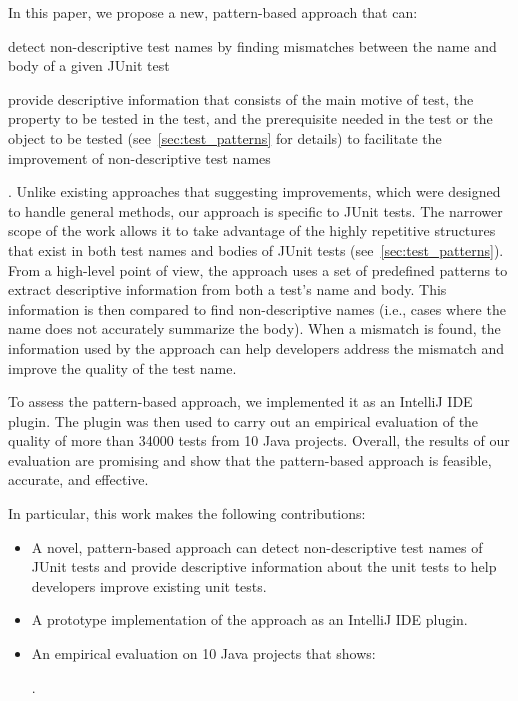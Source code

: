 \documentclass[proposal.tex]{subfiles}
\begin{document}
In this paper, we propose a new, pattern-based approach that can:
\begin{enumerate*}
\item detect non-descriptive test names by finding mismatches between the name and body of a given JUnit test
\item provide descriptive information that consists of the main motive of test, the property to be tested in the test, and the prerequisite needed in the test or the object to be tested (see~\cref{sec:test_patterns} for details) to facilitate the improvement of non-descriptive test names
\end{enumerate*}.
%
Unlike existing approaches that suggesting improvements, which were designed to handle general methods, our approach is specific to JUnit tests.
%
The narrower scope of the work allows it to take advantage of the highly repetitive structures that exist in both test names and bodies of JUnit tests (see~\cref{sec:test_patterns}).
%
From a high-level point of view, the approach uses a set of predefined patterns to extract descriptive information from both a test's name and body.
%
This information is then compared to find non-descriptive names (i.e., cases where the name does not accurately summarize the body).
%
When a mismatch is found, the information used by the approach can help developers address the mismatch and improve the quality of the test name.


To assess the pattern-based approach, we implemented it as an IntelliJ IDE plugin.
%
The plugin was then used to carry out an empirical evaluation of the quality of more than \num{34000} tests from \num{10} Java projects.
%
Overall, the results of our evaluation are promising and show that the pattern-based approach is feasible, accurate, and effective.


In particular, this work makes the following contributions:
\begin{itemize}
  \item A novel, pattern-based approach can detect non-descriptive test names of JUnit tests and provide descriptive information about the unit tests to help developers improve existing unit tests.
  \item A prototype implementation of the approach as an IntelliJ IDE plugin.
  \item An empirical evaluation on \num{10} Java projects that shows:
      .
\end{itemize}
\end{document}
